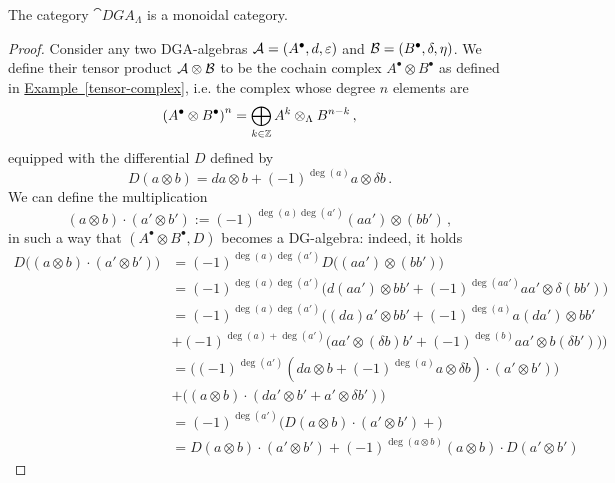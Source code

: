 	\begin{prop}
		The category $\cat{DGA}_{\Lambda}$ is a %
		monoidal category.
		\begin{proof}
			Consider any two DGA-algebras $\mathcal{A} = (A^{\bullet},d,\varepsilon)$
			and $\mathcal{B} = (B^{\bullet}, \delta, \eta)$.
			We define their tensor product $\mathcal{A} \otimes \mathcal{B}$
			to be the cochain complex $A^{\bullet} \otimes B^{\bullet}$
			as defined in \hyperref[tensor-complex]{Example~\ref{tensor-complex}},
			i.e. the complex whose degree $n$ elements are
			\begin{equation*}
				\left( A^{\bullet} \otimes B^{\bullet} \right)^{n}
				= \bigoplus_{k \in {\mathbb Z}} A^{k} \otimes_{\Lambda} B^{n-k}\,,
			\end{equation*}
			equipped with the differential $D$ defined by
			\begin{equation*}
				D(a \otimes b) = da \otimes b + (-1)^{\deg(a)}a \otimes \delta b\,.
			\end{equation*}
			We can define the multiplication
			\begin{equation*}
				(a \otimes b) \cdot (a' \otimes b')
				:= (-1)^{\deg(a)\deg(a')}(aa') \otimes (bb')\,,
			\end{equation*}
			in such a way that $(A^{\bullet} \otimes B^{\bullet},D)$
			becomes a DG-algebra: indeed, it holds
			\begin{align*}
				D\big((a \otimes b) \cdot (a' \otimes b')\big)
				&= (-1)^{\deg(a)\deg(a')} D\big( (aa') \otimes (bb') ) \\
				&= (-1)^{\deg(a)\deg(a')} \big( d(aa') \otimes bb'
				+ (-1)^{\deg(aa')} aa' \otimes \delta(bb') \big) \\
				&= (-1)^{\deg(a)\deg(a')} 
				\Big( (da)a' \otimes bb' + (-1)^{\deg(a)}a(da') \otimes bb' \\
				&+ (-1)^{\deg(a) + \deg(a')} 
				\big(aa' \otimes (\delta b)b' 
				+ (-1)^{\deg(b)} aa' \otimes b(\delta b')\big)\Big) \\
				&= 
				\big( (-1)^{\deg(a')} ( da \otimes b %
				+ (-1)^{\deg(a)} a \otimes \delta b) \cdot (a' \otimes b') \big) \\
				&+ \big((a \otimes b) \cdot (da' \otimes b' + a' \otimes \delta b' )\big) \\
				&= (-1)^{\deg(a')} \big( D(a \otimes b) \cdot (a' \otimes b')
				+ \big)\\
				&= D(a \otimes b) \cdot (a' \otimes b')
				+(-1)^{\deg(a \otimes b)} (a \otimes b) \cdot D(a' \otimes b')

\end{align*}
\end{proof}
\end{prop}
